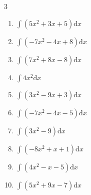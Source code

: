 \begin{multicols}{3}
\begin{enumerate}
\columnbreak %

\resetques

  \item $\displaystyle \int \left( 5x^{2}+3x+5 \right) \mathrm{d}x$


  \item $\displaystyle \int \left( -7x^{2}-4x+8 \right) \mathrm{d}x$


  \item $\displaystyle \int \left( 7x^{2}+8x-8 \right) \mathrm{d}x$


  \item $\displaystyle \int 4x^{2} \mathrm{d}x$


  \item $\displaystyle \int \left( 3x^{2}-9x+3 \right) \mathrm{d}x$


  \item $\displaystyle \int \left( -7x^{2}-4x-5 \right) \mathrm{d}x$


  \item $\displaystyle \int \left( 3x^{2}-9 \right) \mathrm{d}x$


  \item $\displaystyle \int \left( -8x^{2}+x+1 \right) \mathrm{d}x$


  \item $\displaystyle \int \left( 4x^{2}-x-5 \right) \mathrm{d}x$


  \item $\displaystyle \int \left( 5x^{2}+9x-7 \right) \mathrm{d}x$



\end{enumerate}
\end{multicols}
